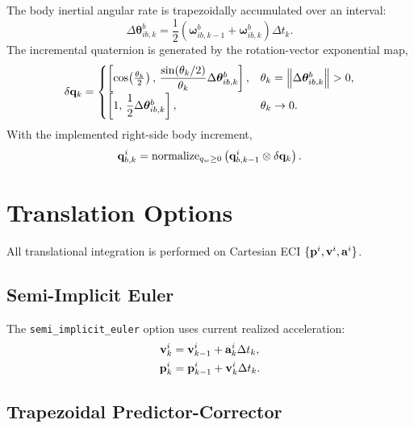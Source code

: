 The body inertial angular rate is trapezoidally accumulated over an interval:
\begin{equation}
\Delta\boldsymbol{\theta}_{ib,k}^{b}
=
\frac{1}{2}
\left(
\boldsymbol{\omega}_{ib,k-1}^{b}
+
\boldsymbol{\omega}_{ib,k}^{b}
\right)\Delta t_k.
\label{eq:trajectory_delta_theta}
\end{equation}
The incremental quaternion is generated by the rotation-vector exponential
map,
\begin{equation}
\delta\mathbf{q}_k
=
\begin{cases}
\left[
\cos\!\left(\frac{\theta_k}{2}\right),\,
\dfrac{\sin(\theta_k/2)}{\theta_k}
\Delta\boldsymbol{\theta}_{ib,k}^{b}
\right],
& \theta_k=\left\lVert \Delta\boldsymbol{\theta}_{ib,k}^{b} \right\rVert>0,\\[6pt]
\left[1,\,\dfrac{1}{2}\Delta\boldsymbol{\theta}_{ib,k}^{b}\right],
& \theta_k\rightarrow 0.
\end{cases}
\label{eq:trajectory_delta_quaternion}
\end{equation}
With the implemented right-side body increment,
\begin{equation}
\mathbf{q}_{b,k}^{i}
=
\operatorname{normalize}_{q_w\geq0}
\left(
\mathbf{q}_{b,k-1}^{i}\otimes\delta\mathbf{q}_k
\right).
\label{eq:trajectory_quaternion_integration}
\end{equation}

\section{Translation Options}

All translational integration is performed on Cartesian ECI
$\{\mathbf{p}^{i},\mathbf{v}^{i},\mathbf{a}^{i}\}$.

\subsection{Semi-Implicit Euler}

The \texttt{semi\_implicit\_euler} option uses current realized acceleration:
\begin{align}
\mathbf{v}_k^{i}
&=\mathbf{v}_{k-1}^{i}+\mathbf{a}_k^{i}\Delta t_k,
\label{eq:semi_implicit_velocity}\\
\mathbf{p}_k^{i}
&=\mathbf{p}_{k-1}^{i}+\mathbf{v}_k^{i}\Delta t_k.
\label{eq:semi_implicit_position}
\end{align}

\subsection{Trapezoidal Predictor-Corrector}

